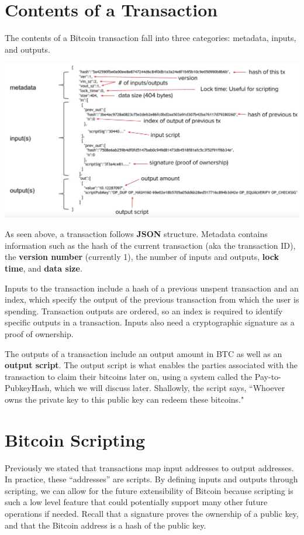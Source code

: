 \documentclass[full.tex]{subfiles}
\begin{document}
    \section*{Contents of a Transaction}
    
    The contents of a Bitcoin transaction fall into three categories: metadata, inputs, and outputs.
    
   \includegraphics[scale=0.3]{transaction_contents}
   
   As seen above, a transaction follows \textbf{JSON} structure. Metadata contains information such as the hash of the current transaction (aka the transaction ID), the \textbf{version number} (currently 1), the number of inputs and outputs, \textbf{lock time}, and \textbf{data size}.
   
   Inputs to the transaction include a hash of a previous unspent transaction and an index, which specify the output of the previous transaction from which the user is spending. Transaction outputs are ordered, so an index is required to identify specific outputs in a transaction. Inputs also need a cryptographic signature as a proof of ownership. 
   
   The outputs of a transaction include an output amount in BTC as well as an \textbf{output script}. The output script is what enables the parties associated with the transaction to claim their bitcoins later on, using a system called the Pay-to-PubkeyHash, which we will discuss later. Shallowly, the script says, ``Whoever owns the private key to this public key can redeem these bitcoins."
   
   \section*{Bitcoin Scripting}
   
   Previously we stated that transactions map input addresses to output addresses. In practice, these ``addresses'' are scripts. By defining inputs and outputs through scripting, we can allow for the future extensibility of Bitcoin because scripting is such a low level feature that could potentially support many other future operations if needed. Recall that a signature proves the ownership of a public key, and that the Bitcoin address is a hash of the public key.
   
\end{document}

